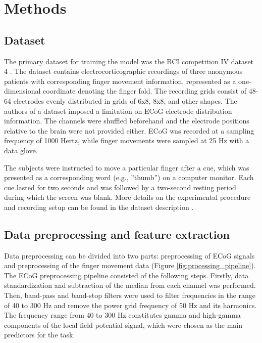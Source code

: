 \documentclass[letterpaper]{article} \usepackage{aaai22}  \usepackage{times}  \usepackage{helvet}  \usepackage{courier}  \usepackage[hyphens]{url}  \usepackage{graphicx} \urlstyle{rm} \def\UrlFont{\rm}  \usepackage{natbib}  \usepackage{caption} \DeclareCaptionStyle{ruled}{labelfont=normalfont,labelsep=colon,strut=off} \frenchspacing  \setlength{\pdfpagewidth}{8.5in}  \setlength{\pdfpageheight}{11in}  \usepackage{algorithm}
\begin{document}
\section{Methods}

\subsection{Dataset}

The primary dataset for training the model was the BCI competition IV dataset 4 \citep{schalk2007}. The dataset contains electrocorticographic recordings of three anonymous patients with corresponding finger movement information, represented as a one-dimensional coordinate denoting the finger fold. The recording grids consist of 48-64 electrodes evenly distributed in grids of 6x8, 8x8, and other shapes. The authors of a dataset imposed a limitation on ECoG electrode distribution information. The channels were shuffled beforehand and the electrode positions relative to the brain were not provided either. ECoG was recorded at a sampling frequency of 1000 Hertz, while finger movements were sampled at 25 Hz with a data glove.

The subjects were instructed to move a particular finger after a cue, which was presented as a corresponding word (e.g., ”thumb”) on a computer monitor. Each cue lasted for two seconds and was followed by a two-second resting period during which the screen was blank. More details on the experimental procedure and recording setup can be found in the dataset description \citep{miller2008}.

\subsection{Data preprocessing and feature extraction}

Data preprocessing can be divided into two parts: preprocessing of ECoG signals and preprocessing of the finger movement data (Figure \ref{fig:processing_pipeline}). The ECoG preprocessing pipeline consisted of the following steps. Firstly, data standardization and subtraction of the median from each channel was performed. Then, band-pass and band-stop filters were used to filter frequencies in the range of 40 to 300 Hz and remove the power grid frequency of 50 Hz and its harmonics. The frequency range from 40 to 300 Hz constitutes gamma and high-gamma components of the local field potential signal, which were chosen as the main predictors for the task.
\end{document}
